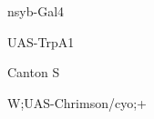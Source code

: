 \documentclass[17pt]{extarticle}
\begin{document}
\bf
\vspace*{-0.15cm}
\begin{large}
nsyb-Gal4 \\[0.5em]
\end{large}

\newpage\vspace*{-0.15cm}
\begin{large}
UAS-TrpA1 \\[0.5em]
\end{large}

\newpage\vspace*{-0.15cm}
\begin{large}
Canton S \\[0.5em]
\end{large}

\newpage\vspace*{-0.15cm}
\begin{large}
W;UAS-Chrimson/cyo;+ \\[0.5em]
\end{large}

\newpage
\end{document}
